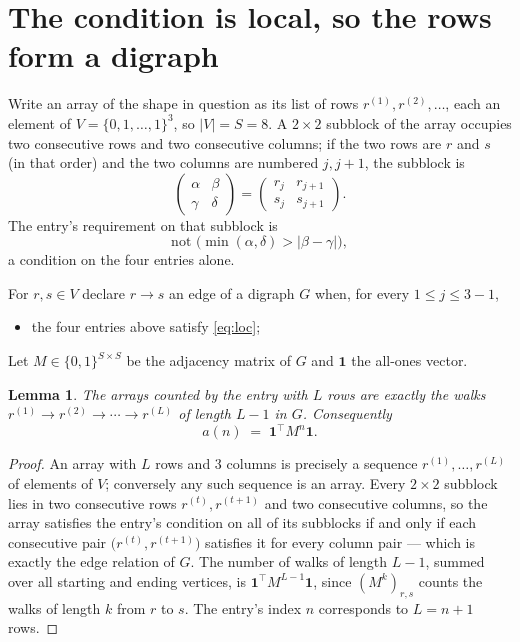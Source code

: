 \documentclass[11pt,a4paper]{article}
\theoremstyle{plain}
\newtheorem{lemma}[theorem]{Lemma}
\theoremstyle{definition}
\begin{document}
\section{The condition is local, so the rows form a digraph}

Write an array of the shape in question as its list of rows
$r^{(1)},r^{(2)},\dots$, each an element of
$V=\{0,1,\dots,1\}^{3}$, so $|V|=S=8$. A $2\times2$ subblock of the array
occupies two consecutive rows and two consecutive columns; if the two rows are $r$
and $s$ (in that order) and the two columns are numbered $j,j+1$,
the subblock is
\[
\begin{pmatrix}\alpha&\beta\\\gamma&\delta\end{pmatrix}=\begin{pmatrix}r_j&r_{j+1}\\s_j&s_{j+1}\end{pmatrix}.
\]
The entry's requirement on that subblock is
\begin{equation}\label{eq:loc}
\text{not }\bigl(\min(\alpha,\delta)>|\beta-\gamma|\bigr),
\end{equation}
a condition on the four entries alone.

For $r,s\in V$ declare $r\to s$ an edge of a digraph $G$ when, for every
$1\le j\le 3-1$,
\begin{itemize}
\item the four entries above satisfy \eqref{eq:loc};

\end{itemize}
Let $M\in\{0,1\}^{S\times S}$ be the adjacency matrix of $G$ and $\mathbf{1}$ the
all-ones vector.

\begin{lemma}\label{lem:walk}
The arrays counted by the entry with $L$ rows are exactly the walks
$r^{(1)}\to r^{(2)}\to\cdots\to r^{(L)}$ of length $L-1$ in $G$. Consequently
\[
a(n)\;=\;\mathbf{1}^{\!\top}M^{n}\mathbf{1} .
\]
\end{lemma}

\begin{proof}
An array with $L$ rows and $3$ columns is precisely a sequence
$r^{(1)},\dots,r^{(L)}$ of elements of $V$; conversely any such sequence is an array.
Every $2\times2$ subblock lies in two consecutive rows $r^{(t)},r^{(t+1)}$ and two
consecutive columns, so the array satisfies the entry's condition on all of its subblocks
if and only if each consecutive pair $\bigl(r^{(t)},r^{(t+1)}\bigr)$ satisfies it for
every column pair --- which is exactly the edge relation of $G$. The number of walks of
length $L-1$, summed over all starting and ending vertices, is
$\mathbf{1}^{\!\top}M^{L-1}\mathbf{1}$, since $(M^{k})_{r,s}$ counts the walks of
length $k$ from $r$ to $s$. The entry's index $n$ corresponds to $L=n+1$ rows.
\end{proof}
\end{document}
